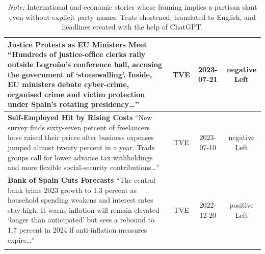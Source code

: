\documentclass[12pt]{article}
\begin{document}
\begin{center}
\begin{longtable}{|p{8cm}|c|c|c|}
	\textbf{Justice Protests as EU Ministers Meet}\newline
	{\scriptsize“Hundreds of justice-office clerks rally outside Logroño’s conference hall, accusing the government of ‘stonewalling’.  Inside, EU ministers debate cyber-crime, organised crime and victim protection under Spain’s rotating presidency…”}
	& TVE & 2023-07-21 & negative Left\\
	\hline
	
	\textbf{Self-Employed Hit by Rising Costs}\newline
	{\scriptsize“New survey finds sixty-seven percent of freelancers have raised their prices after business expenses jumped almost twenty percent in a year.  Trade groups call for lower advance tax withholdings and more flexible social-security contributions…”}
	& TVE & 2023-07-10 & negative Left\\
	\hline
	
	\textbf{Bank of Spain Cuts Forecasts}\newline
	{\scriptsize“The central bank trims 2023 growth to 1.3 percent as household spending weakens and interest rates stay high.  It warns inflation will remain elevated ‘longer than anticipated’ but sees a rebound to 1.7 percent in 2024 if anti-inflation measures expire…”}
	& TVE & 2022-12-20 & positive Left\\
	\hline
	
	\caption*{\small \textit{Note:} International and economic stories whose framing implies a partisan slant even without explicit party names.  Texts shortened, translated to English, and headlines created with the help of ChatGPT.}
	\label{tab:international}
\end{longtable}

\end{center}
\end{document}
